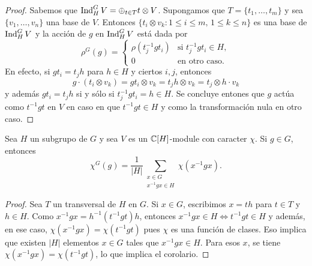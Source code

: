 \begin{proof}
    Sabemos que $\operatorname{Ind}_H^GV=\oplus_{t\in T}t\otimes V$. 
    Supongamos que $T=\{t_1,\dots,t_m\}$ 
    y sea $\{v_1,\dots,v_n\}$ una base de $V$. 
    Entonces $\{t_i\otimes v_k:1\leq i\leq m,\,1\leq k\leq n\}$ es 
    una base de $\operatorname{Ind}_H^GV$ y la acción
    de $g$ en $\operatorname{Ind}_H^GV$ está dada por
    \[
    \rho^G(g)=\begin{cases}
    \rho(t_j^{-1}gt_i) & \text{si $t_j^{-1}gt_i\in H$},\\
    0 & \text{en otro caso}.
    \end{cases}
    \]
    En efecto, si $gt_i=t_jh$ para $h\in H$ y ciertos $i,j$, entonces 
    \[
    g\cdot (t_i\otimes v_k)=gt_i\otimes v_k=t_jh\otimes v_k=t_j\otimes h\cdot v_k
    \]
    y además $gt_i=t_jh$ si y sólo si $t_j^{-1}gt_i=h\in H$. Se concluye entones
    que $g$ actúa como $t^{-1}gt$ en $V$ en caso en que $t^{-1}gt\in H$ y 
    como la transformación nula en otro caso. 
\end{proof}

\begin{corollary}
\label{cor:induccion}
    Sea $H$ un subgrupo de $G$ 
    y sea $V$ es un $\mathbb{C}[H]$-module con caracter $\chi$.
    Si $g\in G$, entonces
    \[
    \chi^G(g)=\frac{1}{|H|}\sum_{\substack{x\in G\\x^{-1}gx\in H}}\chi(x^{-1}gx).
    \]
\end{corollary}

\begin{proof}
    Sea $T$ un transversal de $H$ en $G$. Si $x\in G$, escribimos $x=th$ para $t\in T$ y $h\in H$. 
    Como $x^{-1}gx=h^{-1}(t^{-1}gt)h$, entonces $x^{-1}gx\in H\Longleftrightarrow t^{-1}gt\in H$ y además, en ese caso, 
    $\chi(x^{-1}gx)=\chi(t^{-1}gt)$ pues $\chi$ es una función de clases. Eso implica que existen $|H|$ elementos $x\in G$ 
    tales que $x^{-1}gx\in H$. Para esos $x$, se tiene $\chi(x^{-1}gx)=\chi(t^{-1}gt)$, lo que implica 
    el corolario. 
\end{proof}